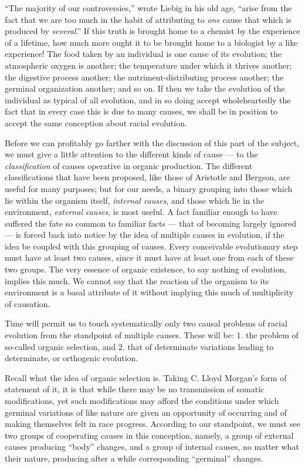 \documentclass[a4paper, 11pt, oneside, polutonikogreek, english]{article}
\begin{document}
``The majority of our controversies,'' wrote Liebig in his old age, ``arise from the fact that we are too much in the habit of attributing to \emph{one} cause that which is produced by \emph{several}.'' If this truth is brought home to a chemist by the experience of a lifetime, how much more ought it to be brought home to a biologist by a like experience! The food taken by an individual is one cause of its evolution; the atmospheric oxygen is another; the temperature under which it thrives another; the digestive process another; the nutriment-distributing process another; the germinal organization another; and so on. If then we take the evolution of the individual as typical of all evolution, and in so doing accept wholeheartedly the fact that in every case this is due to many causes, we shall be in position to accept the same conception about racial evolution.

Before we can profitably go farther with the discussion of this part of the subject, we must give a little attention to the different kinds of cause --- to the \emph{classification} of causes operative in organic production. The different classifications that have been proposed, like those of Aristotle and Bergson, are useful for many purposes; but for our needs, a binary grouping into those which lie within the organism itself, \emph{internal causes}, and those which lie in the environment, \emph{external causes}, is most useful. A fact familiar enough to have suffered the fate so common to familiar facts --- that of becoming largely ignored --- is forced back into notice by the idea of multiple causes in evolution, if the idea be coupled with this grouping of causes. Every conceivable evolutionary step must have at least two causes, since it must have at least one from each of these two groups. The very essence of organic existence, to say nothing of evolution, implies this much. We cannot say that the reaction of the organism to its environment is a basal attribute of it without implying this much of multiplicity of causation.

Time will permit us to touch systematically only two causal problems of racial evolution from the standpoint of multiple causes. These will be: 1. the problem of so-called organic selection, and 2. that of determinate variations leading to determinate, or orthogenic evolution.

Recall what the idea of organic selection is. Taking C. Lloyd Morgan's form of statement of it, it is that while there may be no transmission of somatic modifications, yet such modifications may afford the conditions under which germinal variations of like nature are given an opportunity of occurring and of making themselves felt in race progress. According to our standpoint, we must see two groups of cooperating causes in this conception, namely, a group of external causes producing ``body'' changes, and a group of internal causes, no matter what their nature, producing after a while corresponding ``germinal'' changes.
\end{document}
